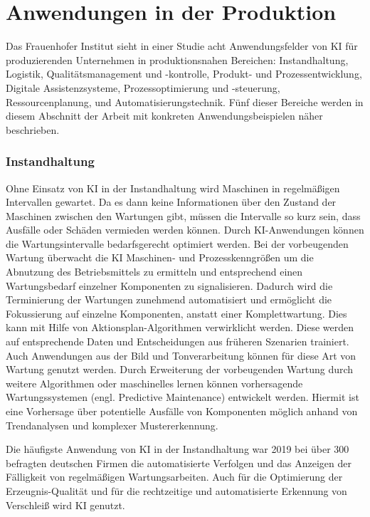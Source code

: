 \documentclass[a4paper,12pt, german]{report}
\begin{document}
\section{Anwendungen in der Produktion}
Das Frauenhofer Institut sieht in einer Studie acht Anwendungsfelder von KI für produzierenden Unternehmen in produktionsnahen Bereichen: Instandhaltung, Logistik, Qualitätsmanagement und -kontrolle, Produkt- und Prozessentwicklung, Digitale Assistenzsysteme, Prozessoptimierung und -steuerung, Ressourcenplanung, und Automatisierungstechnik.\cite{24} Fünf dieser Bereiche werden in diesem Abschnitt der Arbeit mit konkreten Anwendungsbeispielen näher beschrieben.

\subsubsection{Instandhaltung}
Ohne Einsatz von KI in der Instandhaltung wird Maschinen in regelmäßigen Intervallen gewartet. Da es dann keine Informationen über den Zustand der Maschinen zwischen den Wartungen gibt, müssen die Intervalle so kurz sein, dass Ausfälle oder Schäden vermieden werden können. Durch KI-Anwendungen können die Wartungsintervalle bedarfsgerecht optimiert werden. Bei der vorbeugenden Wartung überwacht die KI Maschinen- und Prozesskenngrößen um die Abnutzung des Betriebsmittels zu ermitteln und entsprechend einen Wartungsbedarf einzelner Komponenten zu signalisieren. Dadurch wird die Terminierung der Wartungen zunehmend automatisiert und ermöglicht die Fokussierung auf einzelne Komponenten, anstatt einer Komplettwartung. Dies kann mit Hilfe von Aktionsplan-Algorithmen verwirklicht werden. Diese werden auf entsprechende Daten und Entscheidungen aus früheren Szenarien trainiert. Auch Anwendungen aus der Bild und Tonverarbeitung können für diese Art von Wartung genutzt werden. Durch Erweiterung der vorbeugenden Wartung durch weitere Algorithmen oder maschinelles lernen können vorhersagende Wartungssystemen (engl. Predictive Maintenance)  entwickelt werden. Hiermit ist eine Vorhersage über potentielle Ausfälle von Komponenten möglich anhand von Trendanalysen und komplexer Mustererkennung. \cite{24}

Die häufigste Anwendung von KI in der Instandhaltung war 2019 bei über 300 befragten deutschen Firmen die automatisierte Verfolgen und das Anzeigen der Fälligkeit von regelmäßigen Wartungsarbeiten. Auch für die Optimierung der Erzeugnis-Qualität und für die rechtzeitige und automatisierte Erkennung von Verschleiß wird KI genutzt.\cite{29}
\end{document}
